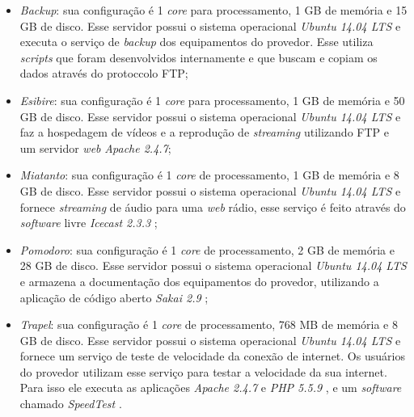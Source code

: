 \begin{itemize}
 \item \textit{Backup}: sua configuração é 1 \textit{core} para processamento, 1 GB de memória e 15 GB de disco. Esse servidor possui o 
 sistema operacional \textit{Ubuntu 14.04 \ac{LTS}} \cite{ubuntu} e executa o serviço de \textit{backup} dos equipamentos do provedor. Esse
 utiliza \textit{scripts} que foram desenvolvidos internamente e que buscam e copiam os dados através do protoccolo \ac{FTP};
 
 \item \textit{Esibire}: sua configuração é 1 \textit{core} para processamento, 1 GB de memória e 50 GB de disco. Esse servidor possui o 
 sistema operacional \textit{Ubuntu 14.04 \ac{LTS}} \cite{ubuntu} e faz a hospedagem de vídeos e a reprodução de \textit{streaming} utilizando
 \ac{FTP} e um servidor \textit{web} \textit{Apache 2.4.7};
 
 \item \textit{Miatanto}: sua configuração é 1 \textit{core} de processamento, 1 GB de memória e 8 GB de disco. Esse servidor possui o 
 sistema operacional \textit{Ubuntu 14.04 \ac{LTS}} \cite{ubuntu} e fornece \textit{streaming} de áudio para uma \textit{web} rádio, esse serviço 
 é feito através do \textit{software} livre \textit{Icecast 2.3.3} \cite{icecast};
 
 \item \textit{Pomodoro}: sua configuração é 1 \textit{core} de processamento, 2 GB de memória e 28 GB de disco. Esse servidor possui o 
 sistema operacional \textit{Ubuntu 14.04 \ac{LTS}} \cite{ubuntu} e armazena a documentação dos equipamentos do provedor, utilizando a aplicação
 de código aberto \textit{Sakai 2.9} \cite{sakai};
 
 \item \textit{Trapel}: sua configuração é 1 \textit{core} de processamento, 768 MB de memória e 8 GB de disco. Esse servidor possui o sistema 
 operacional \textit{Ubuntu 14.04 \ac{LTS}} \cite{ubuntu} e fornece um serviço de teste de velocidade da conexão de internet. Os usuários do 
 provedor utilizam esse serviço para testar a velocidade da sua internet. Para isso ele executa as aplicações \textit{Apache 2.4.7} \cite{apache} 
 e \textit{\ac{PHP} 5.5.9} \cite{php}, e um \textit{software} chamado \textit{SpeedTest} \cite{speedtest}.
\end{itemize}


